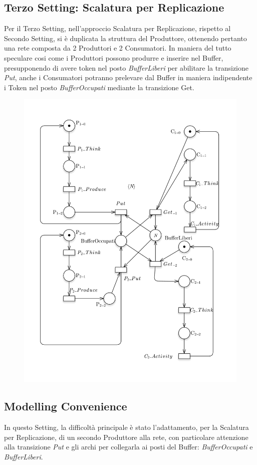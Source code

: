\documentclass{article}
\begin{document}
\subsection{Terzo  Setting: Scalatura per Replicazione}
Per il Terzo Setting, nell'approccio Scalatura per Replicazione, rispetto al Secondo Setting, si è duplicata la struttura del Produttore, ottenendo pertanto una rete composta da 2 Produttori e 2 Consumatori. In maniera del tutto speculare cosi come i Produttori possono produrre e inserire nel Buffer, presupponendo di avere token nel posto \textit{BufferLiberi} per abilitare la transizione \textit{Put}, anche i Consumatori potranno prelevare dal Buffer in maniera indipendente i Token nel posto \textit{BufferOccupati} mediante la transizione {Get}.
\begin{figure}[h] 
\centering
\includegraphics[scale=0.4]{PT-Setting3- Replicazione.png}
\end{figure}
\clearpage
\subsection{Modelling Convenience}
In questo Setting, la difficoltà principale è stato l'adattamento, per la Scalatura per Replicazione, di un secondo Produttore alla rete, con particolare attenzione alla transizione \textit{Put} e gli archi per collegarla ai posti del Buffer: \textit{BufferOccupati} e \textit{BufferLiberi}.
\end{document}
